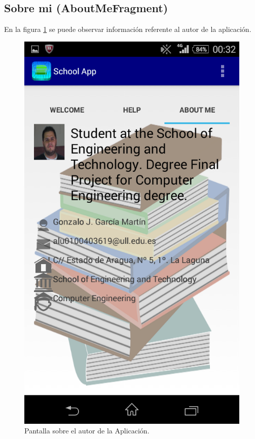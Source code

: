 		\subsection{Sobre mi (AboutMeFragment)}
			En la figura \ref{fig:aboutMe} se puede observar información referente al autor de la aplicación.
		
			\begin{figure}[h !]
				\centering
				\includegraphics[scale=0.2]{Imagenes/App/aboutMe}
				\caption{Pantalla sobre el autor de la Aplicación.}
				\label{fig:aboutMe}
			\end{figure}
	
